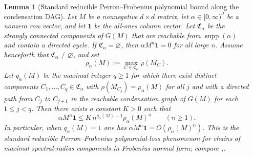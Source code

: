 \documentclass{etds}%
\numberwithin{equation}{section}
\theoremstyle{plain}
\newtheorem{lemma}[theorem]{Lemma}
\theoremstyle{definition}
\theoremstyle{remark}
\begin{document}
\begin{lemma}[Standard reducible Perron--Frobenius polynomial bound along the condensation DAG]
\label{lem:reducible-pf-dag-bound}
Let $M$ be a nonnegative $d\times d$ matrix, let
$\alpha\in[0,\infty)^d$ be a nonzero row vector, and let $\mathbf{1}$ be the
all-ones column vector.  Let $\mathfrak{C}_\alpha$ be the strongly connected
components of $G(M)$ that are reachable from $\operatorname{supp}(\alpha)$ and
contain a directed cycle.  If $\mathfrak{C}_\alpha=\varnothing$, then
$\alpha M^n\mathbf{1}=0$ for all large $n$.  Assume
henceforth that $\mathfrak{C}_\alpha\neq\varnothing$, and set
\[
\rho_\alpha(M):=\max_{C\in\mathfrak{C}_\alpha}\rho(M_C).
\]
Let $q_\alpha(M)$ be the maximal integer $q\ge 1$ for which there exist
distinct components $C_1,\dots,C_q\in\mathfrak{C}_\alpha$ with
$\rho(M_{C_j})=\rho_\alpha(M)$ for all $j$ and with a directed path from
$C_j$ to $C_{j+1}$ in the reachable condensation graph of $G(M)$ for each
$1\le j<q$.  Then there exists a constant $K>0$ such that
\[
\alpha M^n\mathbf{1}\le K\,n^{q_\alpha(M)-1}\rho_\alpha(M)^n
\qquad(n\ge 1).
\]
In particular, when $q_\alpha(M)=1$ one has $\alpha M^n\mathbf{1}=O(\rho_\alpha(M)^n)$.
This is the standard reducible Perron--Frobenius polynomial-loss phenomenon
for chains of maximal spectral-radius components in Frobenius normal form;
compare \cite[Ch.~1]{Seneta2006},\cite[Chs.~3--4]{BermanPlemmons1994}.
\end{lemma}
\end{document}
